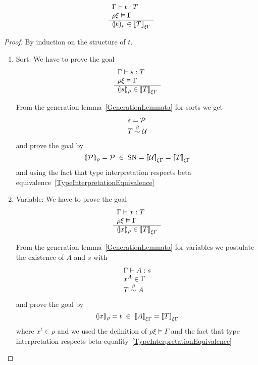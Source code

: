 \begin{theorem}
    \def\goala#1#2#3#4#5{
        \rulev{
            #1 \vdash #2 : #3
            \\
            #4 #5 \vDash #1
        }
        {
            \terminter{#2}{#4} \in \typeinter{#3}{#5#1}
        }
    }
    \def\goalb#1#2#3#4#5{
        \ruleall
        {#1 #3 #4 #5}
        {
            #1 \vdash #2 : #3
            \\
            #4 #5 \vDash #1
        }
        {
            \terminter{#2}{#4} \in \typeinter{#3}{#5#1}
        }
    }
    \def\goal#1#2#3#4#5{
        \forall #1 #2.
        \left[
        \ruleh{
            #1#2 \vDash #3
        }
        {
            \terminter{#4}{#1} \in \typeinter{#5}{#2#3}
        }
        \right]
    }

    $$
    \goala \Gamma t T \rho \xi
    $$
    \begin{proof}
        By induction on the structure of $t$.

        \begin{enumerate}
        \item Sort: We have to prove the goal
            $$
                \goala \Gamma s T \rho \xi
            $$

            From the generation lemma~\ref{GenerationLemmata} for sorts we
            get
            $$
            \begin{array}{l}
                s = {\cal P}
                \\
                T \stackrel{\beta}{\sim} {\cal U}
            \end{array}
            $$
            and prove the goal by
            $$
                {(\!|{\cal P}|\!)_{\rho}} = {\cal P}
                \;\in\;
                \text{SN} =
                {{[\![} {\cal U}{]\!]}}_{\xi\Gamma}
                =
                {{[\![} T{]\!]}}_{\xi\Gamma}
            $$
            and using the fact that type interpretation respects beta
                equivalence~\ref{TypeInterpretationEquivalence}

        \item Variable: We have to prove the goal
            $$
                \goala \Gamma x T \rho \xi
            $$

            From the generation lemma~\ref{GenerationLemmata} for variables
            we postulate the existence of $A$ and $s$ with
            $$
            \begin{array}{l}
                \Gamma \vdash A : s
                \\
                x^A \in \Gamma
                \\
                T \stackrel{\beta}{\sim} A
            \end{array}
            $$
            and prove the goal by
            $$
                {(\!|x|\!)_{\rho}} = t
                \;\in\;
                {{[\![} A{]\!]}}_{\xi\Gamma}
                =
                {{[\![} T{]\!]}}_{\xi\Gamma}
            $$
            where $x^t \in \rho$ and we used the definition of $\rho\xi \vDash
                \Gamma$ and the fact that type interpretation respects beta
                equality~\ref{TypeInterpretationEquivalence}



\end{enumerate}
\end{proof}
\end{theorem}
